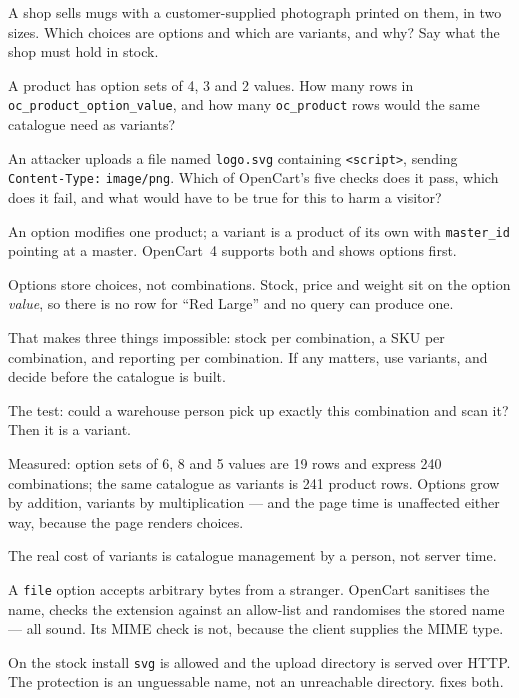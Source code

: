\begin{checkpoint}
\begin{tightnum}
  \item A shop sells mugs with a customer-supplied photograph printed on them,
        in two sizes. Which choices are options and which are variants, and
        why? Say what the shop must hold in stock.
  \item A product has option sets of 4, 3 and 2 values. How many rows in
        \texttt{oc\_product\_option\_value}, and how many
        \texttt{oc\_product} rows would the same catalogue need as variants?
  \item An attacker uploads a file named \texttt{logo.svg} containing
        \texttt{<script>}, sending \texttt{Content-Type:} \texttt{image/png}.
        Which of OpenCart's five checks does it pass, which does it fail, and
        what would have to be true for this to harm a visitor?
\end{tightnum}
\end{checkpoint}

\begin{chaptersummary}
\begin{tight}
  \item An option modifies one product; a variant is a product of its own with
        \texttt{master\_id} pointing at a master. OpenCart~4 supports both and
        shows options first.
  \item Options store choices, not combinations. Stock, price and weight sit on
        the option \emph{value}, so there is no row for ``Red Large'' and no
        query can produce one.
  \item That makes three things impossible: stock per combination, a SKU per
        combination, and reporting per combination. If any matters, use
        variants, and decide before the catalogue is built.
  \item The test: could a warehouse person pick up exactly this combination and
        scan it? Then it is a variant.
  \item Measured: option sets of 6, 8 and 5 values are 19 rows and express 240
        combinations; the same catalogue as variants is 241 product rows.
        Options grow by addition, variants by multiplication --- and the page
        time is unaffected either way, because the page renders choices.
  \item The real cost of variants is catalogue management by a person, not
        server time.
  \item A \texttt{file} option accepts arbitrary bytes from a stranger.
        OpenCart sanitises the name, checks the extension against an allow-list
        and randomises the stored name --- all sound. Its MIME check is not,
        because the client supplies the MIME type.
  \item On the stock install \texttt{svg} is allowed and the upload directory
        is served over HTTP. The protection is an unguessable name, not an
        unreachable directory.  fixes both.
\end{tight}
\end{chaptersummary}

